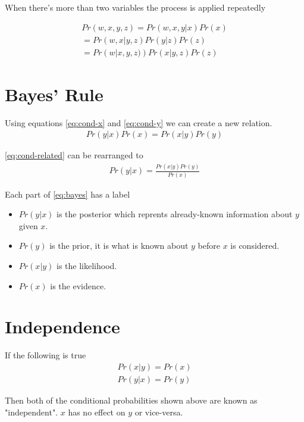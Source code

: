 \documentclass{article}
\begin{document}
When there's more than two variables the process is applied repeatedly

\begin{align*}
	Pr\left( w,x,y,z \right) = Pr\left( w,x,y|x \right) Pr\left( x \right) \\
	= Pr\left( w,x|y,z \right) Pr(y|z) Pr(z) \\
	= Pr\left( w|x,y,z) \right) Pr(x|y,z) Pr\left( z \right) 
\end{align*}

\section{Bayes' Rule}

Using equations \ref{eq:cond-x} and \ref{eq:cond-y} we can create a new relation.
\begin{align}\label{eq:cond-related}
	Pr\left( y|x \right) Pr(x)	= Pr\left( x|y \right) Pr(y)
\end{align}

\ref{eq:cond-related} can be rearranged to
\begin{align}\label{eq:bayes}
	Pr\left( y|x \right) = \frac{Pr\left( x|y \right) Pr\left( y \right) }{Pr\left( x \right) }
\end{align}

Each part of \ref{eq:bayes} has a label

\begin{itemize}
	\item $Pr\left( y|x \right)$ is the posterior which reprents already-known information about $y$ given $x$.
	\item $Pr\left( y \right) $ is the prior, it is what is known about $y$ before $x$ is considered.
	\item $Pr\left( x|y \right) $ is the likelihood.
	\item $Pr\left( x \right) $ is the evidence.
\end{itemize}

\section{Independence}

If the following is true
\begin{align*}
	Pr\left( x|y \right) = Pr(x) \\
	Pr\left( y|x \right) = Pr(y) 
\end{align*}

Then both of the conditional probabilities shown above are known as "independent". $x$ has no effect on $y$ or vice-versa.
\end{document}
